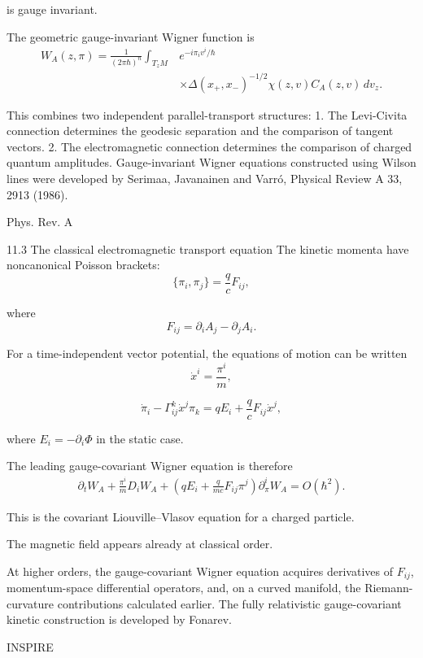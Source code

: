 is gauge invariant.

The geometric gauge-invariant Wigner function is
\[
\boxed{
\begin{aligned}
W_A(z,\pi)
=
\frac1{(2\pi\hbar)^n}
\int_{T_zM}
&e^{-i\pi_iv^i/\hbar}\\
&\times
\Delta(x_+,x_-)^{-1/2}
\chi(z,v)C_A(z,v)\,dv_z.
\end{aligned}
}
\tag{83}
\]

This combines two independent parallel-transport structures:
1. The Levi-Civita connection determines the geodesic separation and the comparison of tangent vectors.
2. The electromagnetic connection determines the comparison of charged quantum amplitudes.
Gauge-invariant Wigner equations constructed using Wilson lines were developed by Serimaa, Javanainen and Varró, Physical Review A 33, 2913 (1986). 

Phys. Rev. A



11.3 The classical electromagnetic transport equation
The kinetic momenta have noncanonical Poisson brackets:
\[
\boxed{
\{\pi_i,\pi_j\}=\frac qcF_{ij},
}
\tag{84}
\]

where
\[
F_{ij}=\partial_iA_j-\partial_jA_i.
\]

For a time-independent vector potential, the equations of motion can be written
\[
\dot x^i=\frac{\pi^i}{m},
\tag{85}
\]

\[
\dot\pi_i-
\Gamma^k_{ij}\dot x^j\pi_k
=
qE_i+\frac qcF_{ij}\dot x^j,
\tag{86}
\]

where \(E_i=-\partial_i\Phi\) in the static case.

The leading gauge-covariant Wigner equation is therefore
\[
\boxed{
\begin{aligned}
\partial_tW_A
+\frac{\pi^i}{m}D_iW_A
+
\left(
qE_i+\frac{q}{mc}F_{ij}\pi^j
\right)\partial_\pi^iW_A
=O(\hbar^2).
\end{aligned}
}
\tag{87}
\]

This is the covariant Liouville–Vlasov equation for a charged particle.

The magnetic field appears already at classical order.

At higher orders, the gauge-covariant Wigner equation acquires derivatives of \(F_{ij}\), momentum-space differential operators, and, on a curved manifold, the Riemann-curvature contributions calculated earlier. The fully relativistic gauge-covariant kinetic construction is developed by Fonarev. 

INSPIRE




